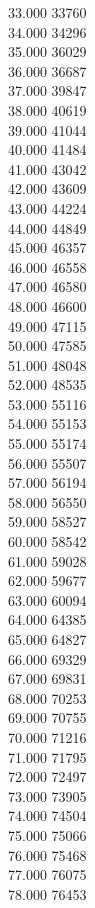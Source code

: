 { 33.000	33760 \\
 34.000	34296 \\
 35.000	36029 \\
 36.000	36687 \\
 37.000	39847 \\
 38.000	40619 \\
 39.000	41044 \\
 40.000	41484 \\
 41.000	43042 \\
 42.000	43609 \\
 43.000	44224 \\
 44.000	44849 \\
 45.000	46357 \\
 46.000	46558 \\
 47.000	46580 \\
 48.000	46600 \\
 49.000	47115 \\
 50.000	47585 \\
 51.000	48048 \\
 52.000	48535 \\
 53.000	55116 \\
 54.000	55153 \\
 55.000	55174 \\
 56.000	55507 \\
 57.000	56194 \\
 58.000	56550 \\
 59.000	58527 \\
 60.000	58542 \\
 61.000	59028 \\
 62.000	59677 \\
 63.000	60094 \\
 64.000	64385 \\
 65.000	64827 \\
 66.000	69329 \\
 67.000	69831 \\
 68.000	70253 \\
 69.000	70755 \\
 70.000	71216 \\
 71.000	71795 \\
 72.000	72497 \\
 73.000	73905 \\
 74.000	74504 \\
 75.000	75066 \\
 76.000	75468 \\
 77.000	76075 \\
 78.000	76453 \\
}
